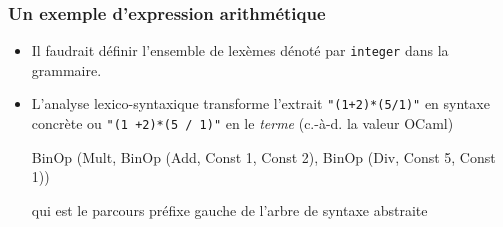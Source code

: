 %
\begin{frame}
\frametitle{Un exemple d'expression arithmétique}

\label{exemple_expr_arith}

\begin{itemize}

  \item Il faudrait définir l'ensemble de lexèmes
  dénoté par \texttt{integer} dans la grammaire.

  \item L'analyse lexico-syntaxique transforme l'extrait
    \texttt{\small "(1+2)*(5/1)"} en syntaxe concrète ou
    \texttt{\small "(1 +2)*(5 / 1)"} en le \emph{terme} (c.-à-d. la
    valeur OCaml)
    \begin{center}
      \textsf{\small BinOp (Mult, BinOp (Add, Const 1, Const 2), BinOp
      (Div, Const 5, Const 1))}
    \end{center}
    qui est le parcours préfixe gauche de l'arbre de syntaxe abstraite
    {\small
    \begin{center}
    \end{center}
    }

\end{itemize}

\end{frame}
